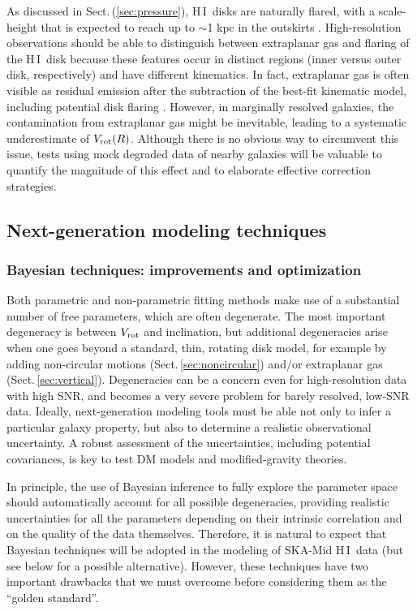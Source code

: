 \documentclass[a4paper,11pt]{article}
\newcommand{\hi } {{\rm H}\,{\small\rm I}}
\begin{document}
As discussed in Sect.\,(\ref{sec:pressure}), \hi\ disks are naturally flared, with a scale-height that is expected to reach up to $\sim$1 kpc in the outskirts \citep{OBrien2010, Bacchini2020, ManceraPina2022}.
High-resolution observations should be able to distinguish between extraplanar gas and flaring of the \hi\ disk because these features occur in distinct regions (inner versus outer disk, respectively) and have different kinematics. In fact, extraplanar gas is often visible as residual emission after the subtraction of the best-fit kinematic model, including potential disk flaring \citep[e.g.,][]{Oosterloo07}.  However, in marginally resolved galaxies, the contamination from extraplanar gas might be inevitable, leading to a systematic underestimate of $V_{\rm rot}(R)$. Although there is no obvious way to circumvent this issue, tests using mock degraded data of nearby galaxies will be valuable to quantify the magnitude of this effect and to elaborate effective correction strategies.

\subsection{Next-generation modeling techniques}

\subsubsection{Bayesian techniques: improvements and optimization}\label{sss:bayes}

Both parametric and non-parametric fitting methods make use of a substantial number of free parameters, which are often degenerate. The most important degeneracy is between $V_{\rm rot}$ and inclination, but additional degeneracies arise when one goes beyond a standard, thin, rotating disk model, for example by adding non-circular motions (Sect.\,\ref{sec:noncircular}) and/or extraplanar gas (Sect.\,\ref{sec:vertical}). Degeneracies can be a concern even for high-resolution data with high SNR, and becomes a very severe problem for barely resolved, low-SNR data. Ideally, next-generation modeling tools must be able not only to infer a particular galaxy property, but also to determine a realistic observational uncertainty. A robust assessment of the uncertainties, including potential covariances, is key to test DM models and modified-gravity theories.

In principle, the use of Bayesian inference to fully explore the parameter space should automatically account for all possible degeneracies, providing realistic uncertainties for all the parameters depending on their intrinsic correlation and on the quality of the data themselves. Therefore, it is natural to expect that Bayesian techniques will be adopted in the modeling of SKA-Mid \hi\ data (but see below for a possible alternative). However, these techniques have two important drawbacks that we must overcome before considering them as the ``golden standard''. 
\end{document}
